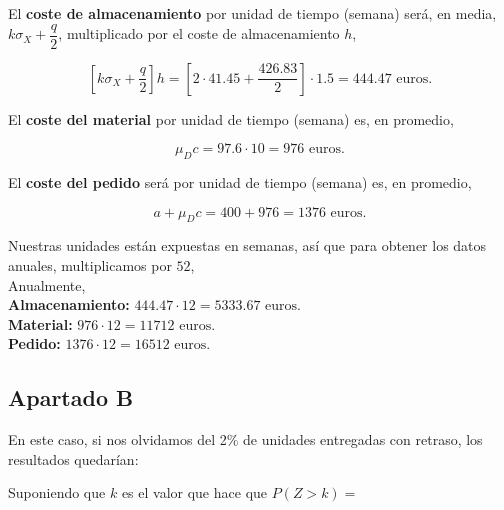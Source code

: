 \documentclass[a4paper,12pt]{article}
\begin{document}
El \textbf{coste de almacenamiento} por unidad de tiempo (semana) ser\'a, en media, $k\sigma_X + \dfrac{q}{2}$, multiplicado por el coste de almacenamiento $h$,

$$ \left[k\sigma_X + \dfrac{q}{2}\right] h = \left[2\cdot 41.45 + \dfrac{426.83}{2} \right]\cdot 1.5 = 444.47\text{ euros.}$$

El \textbf{coste del material} por unidad de tiempo (semana) es, en promedio,

$$ \mu_D c = 97.6\cdot 10 = 976 \text{ euros.}$$

El \textbf{coste del pedido} ser\'a por unidad de tiempo (semana) es, en promedio,

$$ a + \mu_D c = 400 + 976 = 1376 \text{ euros.}$$

Nuestras unidades est\'an expuestas en semanas, as\'i que para obtener los datos anuales, multiplicamos por $52$,\\

Anualmente,\\


\textbf{Almacenamiento:} $444.47\cdot 12 = 5333.67 \text{ euros.}$\\
\textbf{Material:} $976\cdot 12 = 11712\text{ euros.}$\\
\textbf{Pedido:} $1376\cdot 12 = 16512\text{ euros.}$\\


%
%


\subsection{Apartado B}

En este caso, si nos olvidamos del 2\% de unidades entregadas con retraso, los resultados quedar\'ian:

Suponiendo que $k$ es el valor que hace que $P(Z > k) = $
\end{document}
